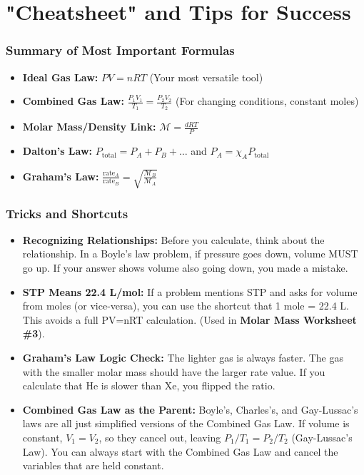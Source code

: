 \documentclass{article}
\begin{document}
\part{"Cheatsheet" and Tips for Success}

\section{Summary of Most Important Formulas}
\begin{itemize}
    \item \textbf{Ideal Gas Law:} $PV = nRT$ (Your most versatile tool)
    \item \textbf{Combined Gas Law:} $\frac{P_1V_1}{T_1} = \frac{P_2V_2}{T_2}$ (For changing conditions, constant moles)
    \item \textbf{Molar Mass/Density Link:} $\mathcal{M} = \frac{dRT}{P}$
    \item \textbf{Dalton's Law:} $P_{\text{total}} = P_A + P_B + \dots$ and $P_A = \chi_A P_{\text{total}}$
    \item \textbf{Graham's Law:} $\frac{\text{rate}_A}{\text{rate}_B} = \sqrt{\frac{\mathcal{M}_B}{\mathcal{M}_A}}$
\end{itemize}

\section{Tricks and Shortcuts}
\begin{itemize}
    \item \textbf{Recognizing Relationships:} Before you calculate, think about the relationship. In a Boyle's law problem, if pressure goes down, volume MUST go up. If your answer shows volume also going down, you made a mistake.
    \item \textbf{STP Means 22.4 L/mol:} If a problem mentions STP and asks for volume from moles (or vice-versa), you can use the shortcut that 1 mole = 22.4 L. This avoids a full PV=nRT calculation. (Used in \textbf{Molar Mass Worksheet \#3}).
    \item \textbf{Graham's Law Logic Check:} The lighter gas is always faster. The gas with the smaller molar mass should have the larger rate value. If you calculate that He is slower than Xe, you flipped the ratio.
    \item \textbf{Combined Gas Law as the Parent:} Boyle's, Charles's, and Gay-Lussac's laws are all just simplified versions of the Combined Gas Law. If volume is constant, $V_1=V_2$, so they cancel out, leaving $P_1/T_1 = P_2/T_2$ (Gay-Lussac's Law). You can always start with the Combined Gas Law and cancel the variables that are held constant.
\end{itemize}
\end{document}
